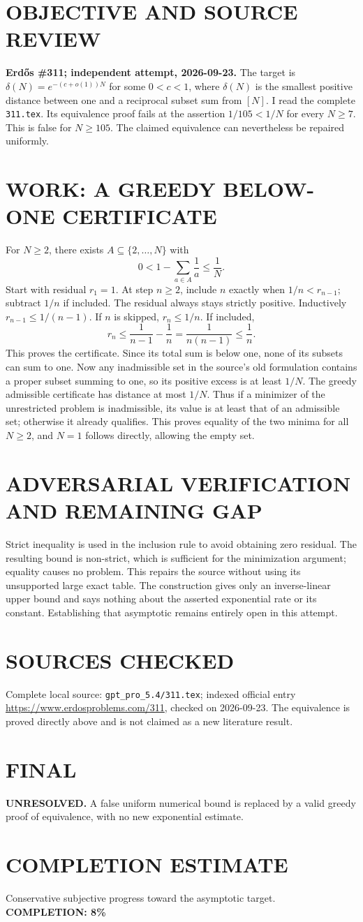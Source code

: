 \section{OBJECTIVE AND SOURCE REVIEW}
\textbf{Erd\H{o}s \#311; independent attempt, 2026-09-23.}
The target is $\delta(N)=e^{-(c+o(1))N}$ for some $0<c<1$, where $\delta(N)$ is the smallest positive distance between one and a reciprocal subset sum from $[N]$. I read the complete \texttt{311.tex}. Its equivalence proof fails at the assertion $1/105<1/N$ for every $N\ge7$. This is false for $N\ge105$. The claimed equivalence can nevertheless be repaired uniformly.
\section{WORK: A GREEDY BELOW-ONE CERTIFICATE}
For $N\ge2$, there exists $A\subseteq\{2,\ldots,N\}$ with
\[
0<1-\sum_{a\in A}\frac1a\le\frac1N.
\]
Start with residual $r_1=1$. At step $n\ge2$, include $n$ exactly when $1/n<r_{n-1}$; subtract $1/n$ if included. The residual always stays strictly positive. Inductively $r_{n-1}\le1/(n-1)$. If $n$ is skipped, $r_n\le1/n$. If included,
\[
r_n\le\frac1{n-1}-\frac1n=\frac1{n(n-1)}\le\frac1n.
\]
This proves the certificate. Since its total sum is below one, none of its subsets can sum to one.
Now any inadmissible set in the source's old formulation contains a proper subset summing to one, so its positive excess is at least $1/N$. The greedy admissible certificate has distance at most $1/N$. Thus if a minimizer of the unrestricted problem is inadmissible, its value is at least that of an admissible set; otherwise it already qualifies. This proves equality of the two minima for all $N\ge2$, and $N=1$ follows directly, allowing the empty set.
\section{ADVERSARIAL VERIFICATION AND REMAINING GAP}
Strict inequality is used in the inclusion rule to avoid obtaining zero residual. The resulting bound is non-strict, which is sufficient for the minimization argument; equality causes no problem. This repairs the source without using its unsupported large exact table. The construction gives only an inverse-linear upper bound and says nothing about the asserted exponential rate or its constant. Establishing that asymptotic remains entirely open in this attempt.
\section{SOURCES CHECKED}
Complete local source: \texttt{gpt\_pro\_5.4/311.tex}; indexed official entry \url{https://www.erdosproblems.com/311}, checked on 2026-09-23. The equivalence is proved directly above and is not claimed as a new literature result.
\section{FINAL}
\textbf{UNRESOLVED.} A false uniform numerical bound is replaced by a valid greedy proof of equivalence, with no new exponential estimate.
\section{COMPLETION ESTIMATE}
Conservative subjective progress toward the asymptotic target.
\textbf{COMPLETION: 8\%}

